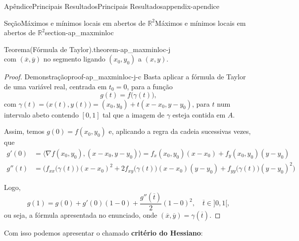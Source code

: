 \documentclass[oneside,10pt,]{book}
\newcommand{\terminology}[1]{\textbf{#1}}
\numberwithin{equation}{section}
\newcommand{\R}{\mathbb R}
\begin{document}
\begin{appendixptx}{Apêndice}{Principais Resultados}{}{Principais Resultados}{}{}{appendix-apendice}
\begin{sectionptx}{Seção}{Máximos e mínimos locais em abertos de \(\R^2\)}{}{Máximos e mínimos locais em abertos de \(\R^2\)}{}{}{section-ap_maxminloc}
\begin{theorem}{Teorema}{(Fórmula de Taylor).}{}{theorem-ap_maxminloc-j}
\begin{equation*}
\end{equation*}
com \((\overline{x},\overline{y})\) no segmento ligando \((x_0,y_0)\) a \((x,y)\).\end{theorem}
\begin{proof}{Demonstração}{}{proof-ap_maxminloc-j-c}
Basta aplicar a fórmula de Taylor de uma variável real, centrada em \(t_0=0\), para a função%
\begin{equation*}
g(t)=f\big(\gamma(t)\big),
\end{equation*}
com \(\gamma(t)=\big(x(t),y(t)\big)=(x_0,y_0)+t(x-x_0,y-y_0)\), para \(t\) num intervalo abeto contendo \([0,1]\) tal que a imagem de \(\gamma\) esteja contida em \(A\).%
\par
Assim, temos \(g(0)=f(x_0,y_0)\) e, aplicando a regra da cadeia sucessivas vezes, que%
\begin{align*}
g'(0)&=\big\langle\nabla
f(x_0,y_0),(x-x_0,y-y_0)\big\rangle=f_x(x_0,y_0)(x-x_0)+f_y(x_0,y_0)(y-y_0)\\
g''(t)&=\Big(f_{xx}\big(\gamma(t)\big)(x-x_0)^2+
2f_{xy}\big(\gamma(t)\big)(x-x_0)(y-y_0)+
f_{yy}\big(\gamma(t)\big)(y-y_0)^2\Big)
\end{align*}
%
\par
Logo,%
\begin{equation*}
g(1)=g(0)+g'(0)(1-0)+\dfrac{g''(\overline{t})}{2}(1-0)^2,\quad
\overline{t}\in ]0,1[,
\end{equation*}
ou seja, a fórmula apresentada no enunciado, onde \((\overline{x},\overline{y})=\gamma(\overline{t})\).%
\end{proof}
Com isso podemos apresentar o chamado \terminology{critério do Hessiano}:%
\end{sectionptx}
\end{appendixptx}
\end{document}

